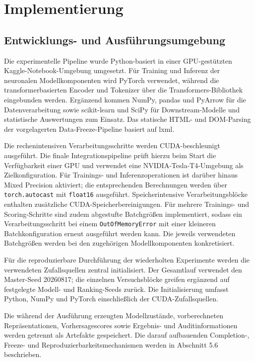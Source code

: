 \chapter{Implementierung}

\section{Entwicklungs- und Ausführungsumgebung}

Die experimentelle Pipeline wurde Python-basiert in einer GPU-gestützten
Kaggle-Notebook-Umgebung umgesetzt. Für Training und Inferenz der neuronalen
Modellkomponenten wird PyTorch verwendet, während die transformerbasierten Encoder und
Tokenizer über die Transformers-Bibliothek eingebunden werden. Ergänzend kommen NumPy,
pandas und PyArrow für die Datenverarbeitung sowie scikit-learn und SciPy für
Downstream-Modelle und statistische Auswertungen zum Einsatz. Das statische HTML- und
DOM-Parsing der vorgelagerten Data-Freeze-Pipeline basiert auf lxml.

Die rechenintensiven Verarbeitungsschritte werden CUDA-beschleunigt ausgeführt. Die finale
Integrationspipeline prüft hierzu beim Start die Verfügbarkeit einer GPU und verwendet eine
NVIDIA-Tesla-T4-Umgebung als Zielkonfiguration. Für Trainings- und Inferenzoperationen ist
darüber hinaus Mixed Precision aktiviert; die entsprechenden Berechnungen werden über
\texttt{torch.autocast} mit \texttt{float16} ausgeführt. Speicherintensive
Verarbeitungsblöcke enthalten zusätzliche CUDA-Speicherbereinigungen. Für mehrere Trainings-
und Scoring-Schritte sind zudem abgestufte Batchgrößen implementiert, sodass ein
Verarbeitungsschritt bei einem \texttt{OutOfMemoryError} mit einer kleineren
Batchkonfiguration erneut ausgeführt werden kann. Die jeweils verwendeten Batchgrößen werden
bei den zugehörigen Modellkomponenten konkretisiert.

Für die reproduzierbare Durchführung der wiederholten Experimente werden die verwendeten
Zufallsquellen zentral initialisiert. Der Gesamtlauf verwendet den Master-Seed 20260817; die
einzelnen Versuchsblöcke greifen ergänzend auf festgelegte Modell- und Ranking-Seeds zurück.
Die Initialisierung umfasst Python, NumPy und PyTorch einschließlich der CUDA-Zufallsquellen.

Die während der Ausführung erzeugten Modellzustände, vorberechneten Repräsentationen,
Vorhersagescores sowie Ergebnis- und Auditinformationen werden getrennt als Artefakte
gespeichert. Die darauf aufbauenden Completion-, Freeze- und Reproduzierbarkeitsmechanismen
werden in Abschnitt 5.6 beschrieben.

